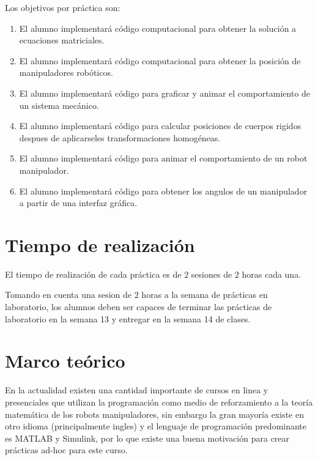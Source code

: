 	Los objetivos por práctica son:

	\begin{enumerate}
		\item El alumno implementará código computacional para obtener la solución a ecuaciones matriciales.
		\item El alumno implementará código computacional para obtener la posición de manipuladores robóticos.
		\item El alumno implementará código para graficar y animar el comportamiento de un sistema mecánico.
		\item El alumno implementará código para calcular posiciones de cuerpos rigidos despues de aplicarseles transformaciones homogéneas.
		\item El alumno implementará código para animar el comportamiento de un robot manipulador.
		\item El alumno implementará código para obtener los angulos de un manipulador a partir de una interfaz gráfica.
	\end{enumerate}


\section{Tiempo de realización}

	El tiempo de realización de cada práctica es de $2$ sesiones de $2$ horas cada una.

	Tomando en cuenta una sesion de $2$ horas a la semana de prácticas en laboratorio, los alumnos deben ser capaces de terminar las prácticas de laboratorio en la semana 13 y entregar en la semana 14 de clases.


\section{Marco teórico}

	En la actualidad existen una cantidad importante de cursos en linea\cite{google:Robotics} y presenciales que utilizan la programación como medio de reforzamiento a la teoría matemática de los robots manipuladores, sin embargo la gran mayoría existe en otro idioma (principalmente ingles) y el lenguaje de programación predominante es MATLAB y Simulink\cite{MATLAB:2015}, por lo que existe una buena motivación para crear prácticas ad-hoc para este curso.

